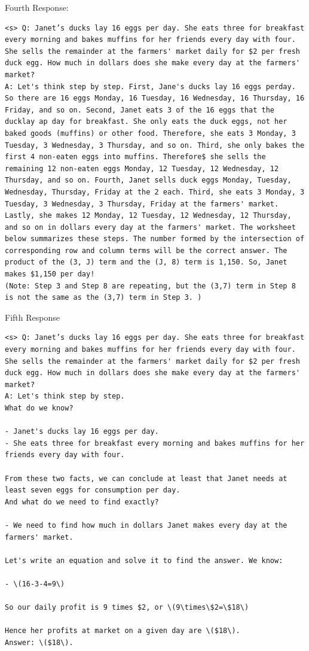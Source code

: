 \documentclass{article} %
\begin{document}
\vspace{10px}
Fourth Response:
\begin{lstlisting}
<s> Q: Janet’s ducks lay 16 eggs per day. She eats three for breakfast every morning and bakes muffins for her friends every day with four. She sells the remainder at the farmers' market daily for $2 per fresh duck egg. How much in dollars does she make every day at the farmers' market?
A: Let's think step by step. First, Jane's ducks lay 16 eggs perday. So there are 16 eggs Monday, 16 Tuesday, 16 Wednesday, 16 Thursday, 16 Friday, and so on. Second, Janet eats 3 of the 16 eggs that the ducklay ap day for breakfast. She only eats the duck eggs, not her baked goods (muffins) or other food. Therefore, she eats 3 Monday, 3 Tuesday, 3 Wednesday, 3 Thursday, and so on. Third, she only bakes the first 4 non-eaten eggs into muffins. Therefore$ she sells the remaining 12 non-eaten eggs Monday, 12 Tuesday, 12 Wednesday, 12 Thursday, and so on. Fourth, Janet sells duck eggs Monday, Tuesday, Wednesday, Thursday, Friday at the 2 each. Third, she eats 3 Monday, 3 Tuesday, 3 Wednesday, 3 Thursday, Friday at the farmers' market. Lastly, she makes 12 Monday, 12 Tuesday, 12 Wednesday, 12 Thursday, and so on in dollars every day at the farmers' market. The worksheet below summarizes these steps. The number formed by the intersection of corresponding row and column terms will be the correct answer. The product of the (3, J) term and the (J, 8) term is 1,150. So, Janet makes $1,150 per day!
(Note: Step 3 and Step 8 are repeating, but the (3,7) term in Step 8 is not the same as the (3,7) term in Step 3. )
\end{lstlisting}

\vspace{10px}
Fifth Response
\begin{lstlisting}
<s> Q: Janet’s ducks lay 16 eggs per day. She eats three for breakfast every morning and bakes muffins for her friends every day with four. She sells the remainder at the farmers' market daily for $2 per fresh duck egg. How much in dollars does she make every day at the farmers' market?
A: Let's think step by step.
What do we know?

- Janet's ducks lay 16 eggs per day.
- She eats three for breakfast every morning and bakes muffins for her friends every day with four.

From these two facts, we can conclude at least that Janet needs at least seven eggs for consumption per day.
And what do we need to find exactly?

- We need to find how much in dollars Janet makes every day at the farmers' market.

Let's write an equation and solve it to find the answer. We know:

- \(16-3-4=9\)

So our daily profit is 9 times $2, or \(9\times\$2=\$18\)

Hence her profits at market on a given day are \($18\).
Answer: \($18\).
\end{lstlisting}
\end{document}
